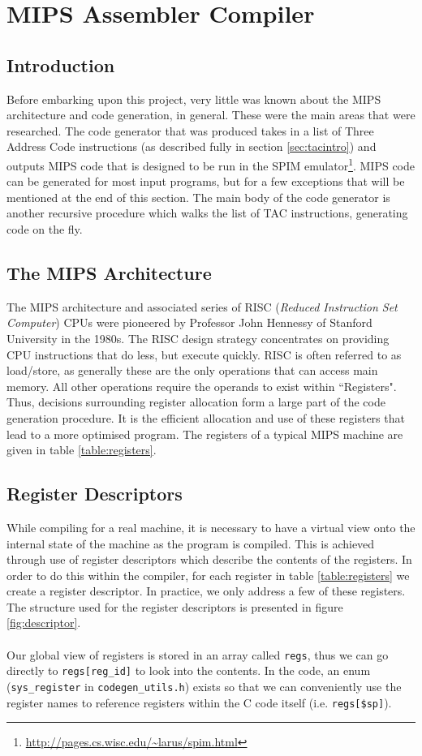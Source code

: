 \section{MIPS Assembler Compiler}
\label{sec:MIPS}
\subsection{Introduction}
Before embarking upon this project, very little was known about the MIPS architecture and code generation, in general. These were the main areas that were researched. The code generator that was produced takes in a list of Three Address Code instructions (as described fully in section \ref{sec:tacintro}) and outputs MIPS code that is designed to be run in the SPIM emulator\footnote{\url{http://pages.cs.wisc.edu/~larus/spim.html}}. MIPS code can be generated for most input programs, but for a few exceptions that will be mentioned at the end of this section. The main body of the code generator is another recursive procedure which walks the list of TAC instructions, generating code on the fly.

\subsection{The MIPS Architecture}
The MIPS architecture and associated series of RISC (\emph{Reduced Instruction Set Computer}) CPUs were pioneered by Professor John Hennessy of Stanford University in the 1980s. The RISC design strategy concentrates on providing CPU instructions that do less, but execute quickly.  RISC is often referred to as load/store, as generally these are the only operations that can access main memory. All other operations require the operands to exist within ``Registers". Thus, decisions surrounding register allocation form a large part of the code generation procedure. It is the efficient allocation and use of these registers that lead to a more optimised program. The registers of a typical MIPS machine are given in table \ref{table:registers}.

\subsection{Register Descriptors}
While compiling for a real machine, it is necessary to have a virtual view onto the internal state of the machine as the program is compiled. This is achieved through use of register descriptors which describe the contents of the registers. In order to do this within the \mmc compiler, for each register in table \ref{table:registers} we create a register descriptor. In practice, we only address a few of these registers. The structure used for the register descriptors is presented in figure \ref{fig:descriptor}.
\ \\ \ \\
Our global view of registers is stored in an array called \verb!regs!, thus we can go directly to \verb!regs[reg_id]! to look into the contents. In the code, an enum (\verb!sys_register! in \verb!codegen_utils.h!) exists so that we can conveniently use the register names to reference registers within the C code itself (i.e. \verb!regs[$sp]!).


